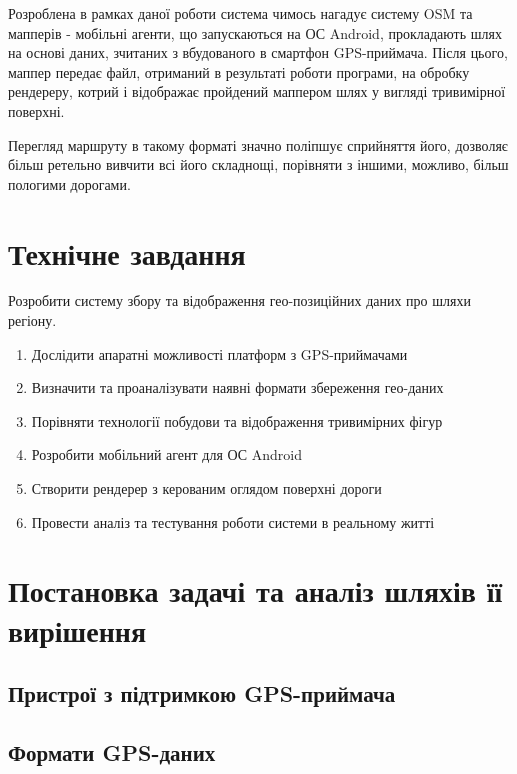 \documentclass[simple,a4paper,14pt,ukrainian,utf8]{eskdtext}
\begin{document}
    Розроблена в рамках даної роботи система чимось нагадує систему OSM та мапперів - мобільні агенти, що запускаються на ОС Android, прокладають шлях на основі даних, зчитаних з вбудованого в смартфон GPS-приймача. Після цього, маппер передає файл, отриманий в результаті роботи програми, на обробку рендереру, котрий і відображає пройдений маппером шлях у вигляді тривимірної поверхні.
    
    Перегляд маршруту в такому форматі значно поліпшує сприйняття його, дозволяє більш ретельно вивчити всі його складнощі, порівняти з іншими, можливо, більш пологими дорогами.

\newpage \section{Технічне завдання}

    Розробити систему збору та відображення гео-позиційних даних про шляхи регіону.

    \begin{enumerate}
        \item Дослідити апаратні можливості платформ з GPS-приймачами
        \item Визначити та проаналізувати наявні формати збереження гео-даних
        \item Порівняти технології побудови та відображення тривимірних фігур
        \item Розробити мобільний агент для ОС Android
        \item Створити рендерер з керованим оглядом поверхні дороги
        \item Провести аналіз та тестування роботи системи в реальному житті
    \end{enumerate}

\newpage \section{Постановка задачі та аналіз шляхів її вирішення}

    \subsection{Пристрої з підтримкою GPS-приймача}

    \subsection{Формати GPS-даних}
\end{document}
